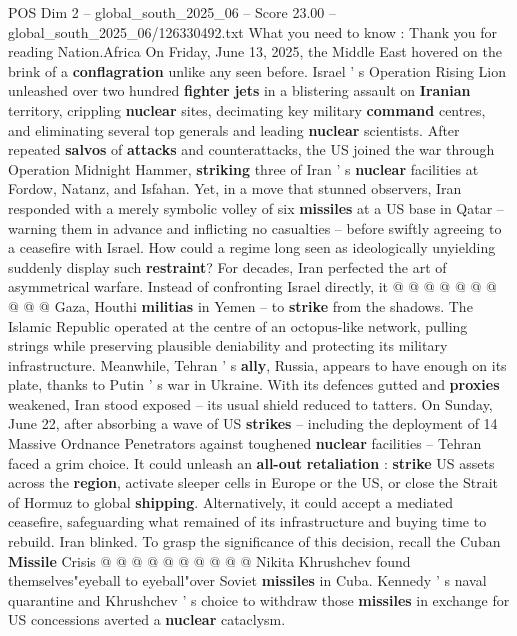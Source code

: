 \begin{textsample}{POS Dim 2 – global\_south\_2025\_06 – Score 23.00 – global\_south\_2025\_06/126330492.txt}  \label{ex:f2_pos_244}
What you need to know : Thank you for reading Nation.Africa On Friday, June 13, 2025, the Middle East hovered on the brink of a \textbf{conflagration} unlike any seen before.
Israel ' s Operation Rising Lion unleashed over two hundred \textbf{fighter} \textbf{jets} in a blistering assault on \textbf{Iranian} territory, crippling \textbf{nuclear} sites, decimating key military \textbf{command} centres, and eliminating several top generals and leading \textbf{nuclear} scientists.
After repeated \textbf{salvos} of \textbf{attacks} and counterattacks, the US joined the war through Operation Midnight Hammer, \textbf{striking} three of Iran ' s \textbf{nuclear} facilities at Fordow, Natanz, and Isfahan.
Yet, in a move that stunned observers, Iran responded with a merely symbolic volley of six \textbf{missiles} at a US base in Qatar -- warning them in advance and inflicting no casualties -- before swiftly agreeing to a ceasefire with Israel.
How could a regime long seen as ideologically unyielding suddenly display such \textbf{restraint}?
For decades, Iran perfected the art of asymmetrical warfare.
Instead of confronting Israel directly, it @ @ @ @ @ @ @ @ @ @ Gaza, Houthi \textbf{militias} in Yemen -- to \textbf{strike} from the shadows.
The Islamic Republic operated at the centre of an octopus-like network, pulling strings while preserving plausible deniability and protecting its military infrastructure.
Meanwhile, Tehran ' s \textbf{ally}, Russia, appears to have enough on its plate, thanks to Putin ' s war in Ukraine.
With its defences gutted and \textbf{proxies} weakened, Iran stood exposed -- its usual shield reduced to tatters.
On Sunday, June 22, after absorbing a wave of US \textbf{strikes} -- including the deployment of 14 Massive Ordnance Penetrators against toughened \textbf{nuclear} facilities -- Tehran faced a grim choice.
It could unleash an \textbf{all-out} \textbf{retaliation} : \textbf{strike} US assets across the \textbf{region}, activate sleeper cells in Europe or the US, or close the Strait of Hormuz to global \textbf{shipping}.
Alternatively, it could accept a mediated ceasefire, safeguarding what remained of its infrastructure and buying time to rebuild.
Iran blinked.
To grasp the significance of this decision, recall the Cuban \textbf{Missile} Crisis @ @ @ @ @ @ @ @ @ @ Nikita Khrushchev found themselves"eyeball to eyeball"over Soviet \textbf{missiles} in Cuba.
Kennedy ' s naval quarantine and Khrushchev ' s choice to withdraw those \textbf{missiles} in exchange for US concessions averted a \textbf{nuclear} cataclysm.

\end{textsample}
